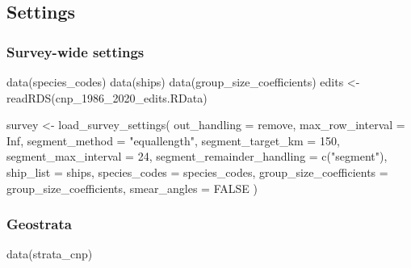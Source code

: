 \documentclass[
]{book}
\newenvironment{Shaded}{\begin{snugshade}}{\end{snugshade}}
\newcommand{\AttributeTok}[1]{\textcolor[rgb]{0.77,0.63,0.00}{#1}}
\newcommand{\ConstantTok}[1]{\textcolor[rgb]{0.00,0.00,0.00}{#1}}
\newcommand{\DecValTok}[1]{\textcolor[rgb]{0.00,0.00,0.81}{#1}}
\newcommand{\FunctionTok}[1]{\textcolor[rgb]{0.00,0.00,0.00}{#1}}
\newcommand{\NormalTok}[1]{#1}
\newcommand{\OtherTok}[1]{\textcolor[rgb]{0.56,0.35,0.01}{#1}}
\newcommand{\StringTok}[1]{\textcolor[rgb]{0.31,0.60,0.02}{#1}}
\begin{document}
\hypertarget{settings-1}{%
\subsection*{Settings}\label{settings-1}}

\hypertarget{survey-wide-settings-2}{%
\subsubsection*{Survey-wide settings}\label{survey-wide-settings-2}}

\begin{Shaded}
\begin{Highlighting}[]
\FunctionTok{data}\NormalTok{(species\_codes)}
\FunctionTok{data}\NormalTok{(ships)}
\FunctionTok{data}\NormalTok{(group\_size\_coefficients)}
\NormalTok{edits }\OtherTok{\textless{}{-}} \FunctionTok{readRDS}\NormalTok{(}\StringTok{\textquotesingle{}cnp\_1986\_2020\_edits.RData\textquotesingle{}}\NormalTok{)}

\NormalTok{survey }\OtherTok{\textless{}{-}} \FunctionTok{load\_survey\_settings}\NormalTok{(}
  \AttributeTok{out\_handling =} \StringTok{\textquotesingle{}remove\textquotesingle{}}\NormalTok{,}
  \AttributeTok{max\_row\_interval =} \ConstantTok{Inf}\NormalTok{,}
  \AttributeTok{segment\_method =} \StringTok{"equallength"}\NormalTok{,}
  \AttributeTok{segment\_target\_km =} \DecValTok{150}\NormalTok{,}
  \AttributeTok{segment\_max\_interval =} \DecValTok{24}\NormalTok{,}
  \AttributeTok{segment\_remainder\_handling =} \FunctionTok{c}\NormalTok{(}\StringTok{"segment"}\NormalTok{),}
  \AttributeTok{ship\_list =}\NormalTok{ ships,}
  \AttributeTok{species\_codes =}\NormalTok{ species\_codes,}
  \AttributeTok{group\_size\_coefficients =}\NormalTok{ group\_size\_coefficients,}
  \AttributeTok{smear\_angles =} \ConstantTok{FALSE}
\NormalTok{)}
\end{Highlighting}
\end{Shaded}

\hypertarget{geostrata-1}{%
\subsubsection*{Geostrata}\label{geostrata-1}}

\begin{Shaded}
\begin{Highlighting}[]
\FunctionTok{data}\NormalTok{(strata\_cnp)}
\end{Highlighting}
\end{Shaded}
\end{document}
